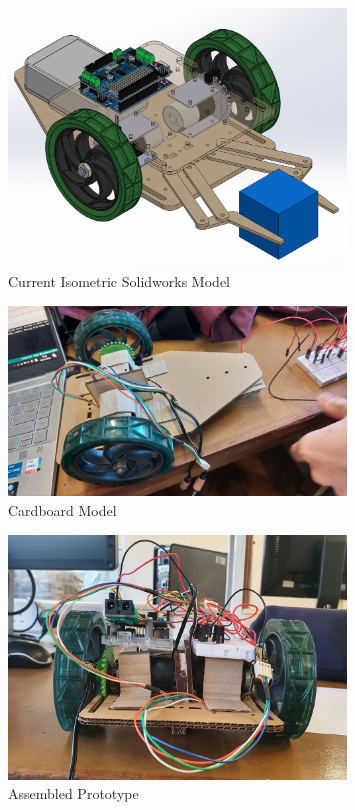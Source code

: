 \documentclass{article}
\begin{document}
\begin{figure}[!h]
    \centering
    \includegraphics[width=0.8\textwidth]{assets/isometric.png}
    \caption{Current Isometric Solidworks Model}
    \label{fig:isometric}
\end{figure}

\begin{figure}[!h]
    \centering
    \includegraphics[width=0.8\textwidth]{assets/Cardboard_model.jpg}
    \caption{Cardboard Model}
    \label{fig:cardboard_model}
\end{figure}

\begin{figure}[!h]
    \centering
    \includegraphics[width=0.8\textwidth]{assets/assembled_prototype.jpg}
    \caption{Assembled Prototype}
    \label{fig:assembled_prototype}
\end{figure}
\end{document}
